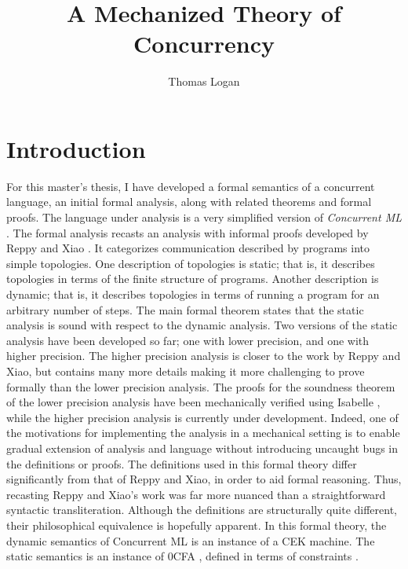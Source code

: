 \documentclass[10pt]{article}
\title{A Mechanized Theory of Concurrency}
\author{Thomas Logan}
\begin{document}
\maketitle
{}

\newpage
{}


\section{Introduction}
For this master's thesis, I have developed a formal semantics of
a concurrent language, an initial formal analysis, along with related theorems and formal 
proofs. The language under analysis is
a very simplified version of \textit{Concurrent ML} \cite{concurrent_ml}. The formal analysis
recasts an analysis with informal proofs developed by Reppy and Xiao \cite{specialization}. It
categorizes communication described by programs into simple topologies. One description of
topologies is static; that is, it describes topologies in terms of the finite structure of
programs.  Another description is dynamic; that is, it describes topologies in terms of running
a program for an arbitrary number of steps. The main formal theorem states that the static
analysis is sound with respect to the dynamic analysis. Two versions of the static analysis
have been developed so far; one with lower precision, and one with higher precision. The higher
precision analysis is closer to the work by Reppy and Xiao, but contains many more details making
it more challenging to prove formally than the lower precision analysis.
The proofs for the soundness theorem of the lower precision analysis
have been mechanically verified using Isabelle \cite{isabelle}, while the higher precision
analysis is currently under development. Indeed, one of the motivations for implementing the analysis 
in a mechanical setting is to enable gradual extension of analysis and language without introducing
uncaught bugs in the definitions or proofs. The definitions used in this formal theory differ
significantly from that of Reppy and Xiao, in order to aid formal reasoning. Thus, recasting
Reppy and Xiao's work was far more nuanced than a straightforward
syntactic transliteration.
Although the definitions are structurally quite different,
their philosophical equivalence is hopefully apparent. 
In this formal theory, the dynamic semantics of Concurrent ML is
an instance of a CEK machine. The static semantics is an instance of 0CFA
\cite{0cfa}, defined in terms of constraints \cite{program_analysis}.
\end{document}
